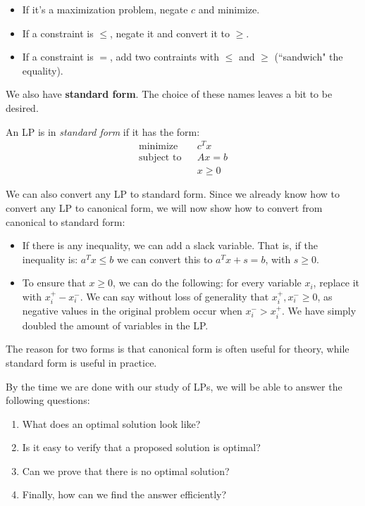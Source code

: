 \documentclass{article}
\begin{document}
\begin{itemize}
\item If it's a maximization problem, negate $c$ and minimize.
\item If a constraint is $\leq$, negate it and convert it to $\geq$.
\item If a constraint is $=$, add two contraints with $\leq$ and
  $\geq$ (``sandwich" the equality).
\end{itemize}

We also have \textbf{standard form}.  The choice of these names leaves
a bit to be desired.

\begin{definition}
  An LP is in \emph{standard form} if it has the form:
  \begin{eqnarray*}
    \textrm{minimize } & & c^T x\\
    \textrm{subject to} & & Ax = b\\
    && x \geq 0
  \end{eqnarray*}
\end{definition}

We can also convert any LP to standard form.  Since we already know how to
convert any LP to canonical form, we will now show how to convert from canonical
to standard form:

\begin{itemize}
 \item   If there is any inequality, we can add a slack variable.
	That is, if the inequality is: $a^T x \leq b$ we can 
	convert this to $a^T x + s = b$, with $s\geq 0$.
\item To ensure that $x \geq 0$, we can do the following: for every variable $x_i$,
	replace it with $x_i^+ - x_i^-$.  We can say without loss of generality that
	$x_i^+, x_i^- \geq 0$, as negative values in the original problem occur when $x_i^- > x_i^+$.  We have simply doubled the amount of variables in the LP.
\end{itemize}

The reason for two forms is that canonical form is
often useful for theory, while standard form is useful in practice.

By the time we are done with our study of LPs, we will be able to answer the following questions: 

\begin{enumerate}

\item What does an optimal solution look like?

\item Is it easy to verify that a proposed solution is optimal?

\item Can we prove that there is no optimal solution?

\item Finally, how can we find the answer efficiently?

\end{enumerate}
\end{document}
